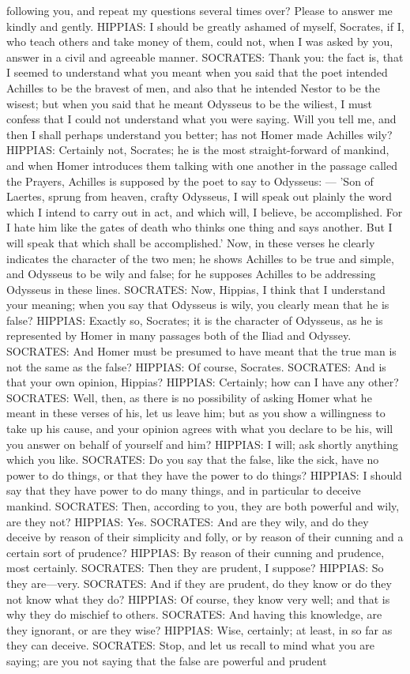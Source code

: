 \documentclass[11pt,letter]{article}
\begin{document}
following you, and repeat my questions several times over? Please to answer me kindly and gently. HIPPIAS:  I should be greatly ashamed of myself, Socrates, if I, who teach others and take money of them, could not, when I was asked by you, answer in a civil and agreeable manner. SOCRATES:  Thank you:  the fact is, that I seemed to understand what you meant when you said that the poet intended Achilles to be the bravest of men, and also that he intended Nestor to be the wisest; but when you said that he meant Odysseus to be the wiliest, I must confess that I could not understand what you were saying. Will you tell me, and then I shall perhaps understand you better; has not Homer made Achilles wily? HIPPIAS:  Certainly not, Socrates; he is the most straight-forward of mankind, and when Homer introduces them talking with one another in the passage called the Prayers, Achilles is supposed by the poet to say to Odysseus: — 'Son of Laertes, sprung from heaven, crafty Odysseus, I will speak out plainly the word which I intend to carry out in act, and which will, I believe, be accomplished. For I hate him like the gates of death who thinks one thing and says another. But I will speak that which shall be accomplished.' Now, in these verses he clearly indicates the character of the two men; he shows Achilles to be true and simple, and Odysseus to be wily and false; for he supposes Achilles to be addressing Odysseus in these lines. SOCRATES:  Now, Hippias, I think that I understand your meaning; when you say that Odysseus is wily, you clearly mean that he is false? HIPPIAS:  Exactly so, Socrates; it is the character of Odysseus, as he is represented by Homer in many passages both of the Iliad and Odyssey. SOCRATES:  And Homer must be presumed to have meant that the true man is not the same as the false? HIPPIAS:  Of course, Socrates. SOCRATES:  And is that your own opinion, Hippias? HIPPIAS:  Certainly; how can I have any other? SOCRATES:  Well, then, as there is no possibility of asking Homer what he meant in these verses of his, let us leave him; but as you show a willingness to take up his cause, and your opinion agrees with what you declare to be his, will you answer on behalf of yourself and him? HIPPIAS:  I will; ask shortly anything which you like. SOCRATES:  Do you say that the false, like the sick, have no power to do things, or that they have the power to do things? HIPPIAS:  I should say that they have power to do many things, and in particular to deceive mankind. SOCRATES:  Then, according to you, they are both powerful and wily, are they not? HIPPIAS:  Yes. SOCRATES:  And are they wily, and do they deceive by reason of their simplicity and folly, or by reason of their cunning and a certain sort of prudence? HIPPIAS:  By reason of their cunning and prudence, most certainly. SOCRATES:  Then they are prudent, I suppose? HIPPIAS:  So they are—very. SOCRATES:  And if they are prudent, do they know or do they not know what they do? HIPPIAS:  Of course, they know very well; and that is why they do mischief to others. SOCRATES:  And having this knowledge, are they ignorant, or are they wise? HIPPIAS:  Wise, certainly; at least, in so far as they can deceive. SOCRATES:  Stop, and let us recall to mind what you are saying; are you not saying that the false are powerful and prudent 
\end{document}
